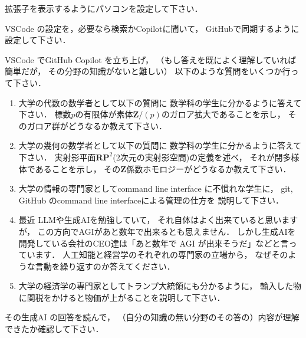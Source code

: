 \begin{Q}
   拡張子を表示するようにパソコンを設定して下さい．
\end{Q}

\begin{Q}
   VSCode の設定を，必要なら検索かCopilotに聞いて，
   GitHubで同期するように設定して下さい．
\end{Q}

\begin{Q}
   VSCode でGitHub Copilot を立ち上げ，
   （もし答えを既によく理解していれば簡単だが，
   その分野の知識がないと難しい）
   以下のような質問をいくつか行って下さい．
   \begin{enumerate}
      \item
         大学の代数の数学者として以下の質問に
        数学科の学生に分かるように答えて下さい．
         標数$p$の有限体が素体$\mathbf Z/(p)$のガロア拡大であることを示し，
         そのガロア群がどうなるか教えて下さい．
         
      \item
         大学の幾何の数学者として以下の質問に
         数学科の学生に分かるように答えて下さい．
         実射影平面$\mathbf R\mathbf P^2$($2$次元の実射影空間)の定義を述べ，
         それが閉多様体であることを示し，
         その$\mathbf Z$係数ホモロジーがどうなるか教えて下さい．
   \item
         大学の情報の専門家としてcommand line interface に不慣れな学生に，
         git, GitHub のcommand line interfaceによる管理の仕方を
         説明して下さい．
         
   \item
         最近 LLMや生成AIを勉強していて，
         それ自体はよく出来ていると思いますが，
         この方向でAGIがあと数年で出来るとも思えません．
         しかし生成AIを開発している会社のCEO達は「あと数年で
         AGI が出来そうだ」などと言っています．
         人工知能と経営学のそれぞれの専門家の立場から，
         なぜそのような言動を繰り返すのか答えてください．
         
      \item
         大学の経済学の専門家としてトランプ大統領にも分かるように，
         輸入した物に関税をかけると物価が上がることを説明して下さい．
         
   \end{enumerate}
   その生成AI の回答を読んで，
   （自分の知識の無い分野のその答の）内容が理解できたか確認して下さい．
\end{Q}


